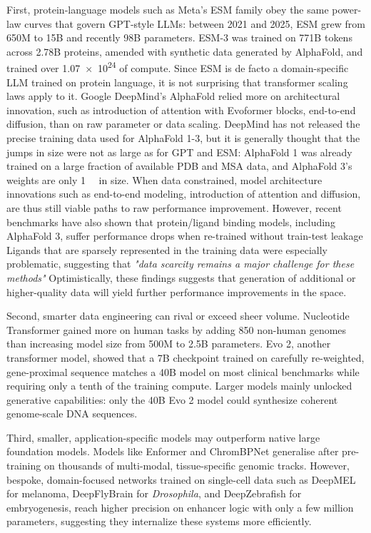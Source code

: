 First, protein-language models such as Meta's ESM family obey the same power-law curves that govern GPT-style LLMs: between 2021 and 2025, ESM grew from 650M to 15B and recently 98B parameters. ESM-3 was trained on 771B tokens across 2.78B proteins, amended with synthetic data generated by AlphaFold, and trained over \SI{1.07e24}{\flops} of compute. Since ESM is de facto a domain-specific LLM trained on protein language, it is not surprising that transformer scaling laws apply to it. Google DeepMind's AlphaFold relied more on architectural innovation, such as introduction of attention with Evoformer blocks, end-to-end diffusion, than on raw parameter or data scaling. DeepMind has not released the precise training data used for AlphaFold 1-3, but it is generally thought that the jumps in size were not as large as for GPT and ESM: AlphaFold 1 was already trained on a large fraction of available PDB and MSA data, and AlphaFold 3's weights are only \SI{1}{\giga\byte} in size. When data constrained, model architecture innovations such as end-to-end modeling, introduction of attention and diffusion, are thus still viable paths to raw performance improvement. However, recent benchmarks have also shown that protein/ligand binding models, including AlphaFold 3, suffer performance drops when re-trained without train-test leakage Ligands that are sparsely represented in the training data were especially problematic, suggesting that \textit{"data scarcity remains a major challenge for these methods"} Optimistically, these findings suggests that generation of additional or higher-quality data will yield further performance improvements in the space.

Second, smarter data engineering can rival or exceed sheer volume. Nucleotide Transformer gained more on human tasks by adding 850 non-human genomes than increasing model size from 500M to 2.5B parameters. Evo 2, another transformer model, showed that a 7B checkpoint trained on carefully re-weighted, gene-proximal sequence matches a 40B model on most clinical benchmarks while requiring only a tenth of the training compute. Larger models mainly unlocked generative capabilities: only the 40B Evo 2 model could synthesize coherent genome-scale DNA sequences.

Third, smaller, application-specific models may outperform native large foundation models. Models like Enformer and ChromBPNet generalise after pre-training on thousands of multi-modal, tissue-specific genomic tracks. However, bespoke, domain-focused networks trained on single-cell data such as DeepMEL for melanoma, DeepFlyBrain for \textit{Drosophila}, and DeepZebrafish for embryogenesis, reach higher precision on enhancer logic with only a few million parameters, suggesting they internalize these systems more efficiently.

